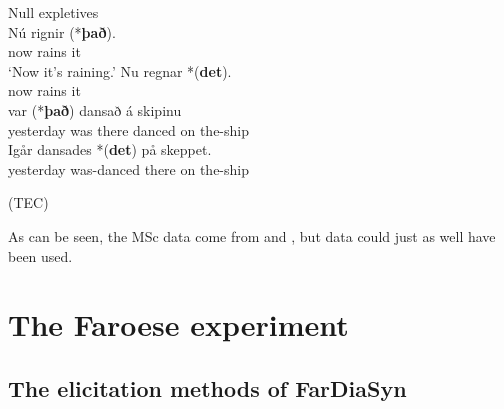 \documentclass[output=paper]{LSP/langsci}
\begin{document}
\ea%
    \settowidth{}
    \label{ex:Thrainsson:6}
    Null expletives\\
    \ea
    \gll Nú   rignir     (*\textbf{það}).\\
	now   rains     it\\
    \glt ‘Now it’s raining.’
    \ex
    \gll  Nu   regnar   *(\textbf{det}).\\
	   now  rains    it\\
    \ex
           var   (*\textbf{það})   dansað   á skipinu  \\
         yesterday    was    there    danced  on the-ship\\
    \ex
    \gll Igår       dansades       *(\textbf{det})    på  skeppet.     \\
         yesterday    was-danced    there    on the-ship\\

    \z
\z

\ea%
    \settowidth{}
    \label{ex:Thrainsson:7}
     (TEC)\\
    \z
\z

As can be seen, the MSc data come from  and , but  data could just as well have been used.

\section{The Faroese experiment}\label{sec:Thrainsson:3}
\subsection{The elicitation methods of FarDiaSyn}
\end{document}
